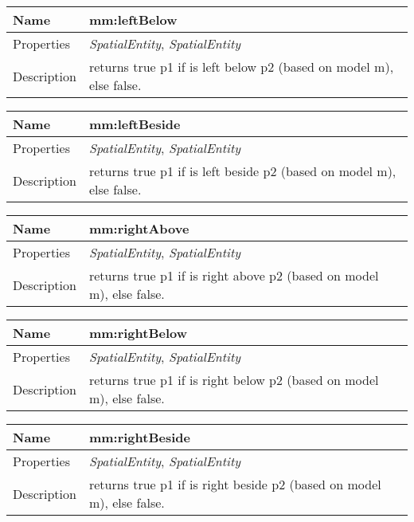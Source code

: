 \vspace{0.3cm}
\newline
\begin{tabular}{|p{3cm}|p{10cm}|}
\hline Name & mm:leftBelow\\
\hline Properties & \textit{SpatialEntity}, \textit{SpatialEntity} \\
\hline Description & returns true p1 if is left below p2 (based on model m), else false.\\
\hline
\end{tabular}
\vspace{0.3cm}
\newline
\begin{tabular}{|p{3cm}|p{10cm}|}
\hline Name & mm:leftBeside\\
\hline Properties & \textit{SpatialEntity}, \textit{SpatialEntity} \\
\hline Description & returns true p1 if is left beside p2 (based on model m), else false.\\
\hline
\end{tabular}
\vspace{0.3cm}
\newline
\begin{tabular}{|p{3cm}|p{10cm}|}
\hline Name & mm:rightAbove\\
\hline Properties & \textit{SpatialEntity}, \textit{SpatialEntity} \\
\hline Description & returns true p1 if is right above p2 (based on model m), else false.\\
\hline
\end{tabular}
\vspace{0.3cm}
\newline
\begin{tabular}{|p{3cm}|p{10cm}|}
\hline Name & mm:rightBelow\\
\hline Properties & \textit{SpatialEntity}, \textit{SpatialEntity} \\
\hline Description & returns true p1 if is right below p2 (based on model m), else false.\\
\hline
\end{tabular}
\vspace{0.3cm}
\newline
\begin{tabular}{|p{3cm}|p{10cm}|}
\hline Name & mm:rightBeside\\
\hline Properties & \textit{SpatialEntity}, \textit{SpatialEntity} \\
\hline Description & returns true p1 if is right beside p2 (based on model m), else false.\\
\hline
\end{tabular}
